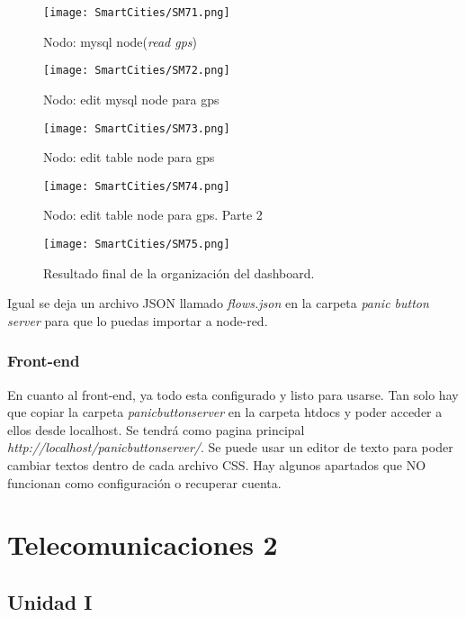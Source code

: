 \documentclass[
	12pt, %
	fleqn, %
	a4paper, %
	oneside, %
]{LegrandOrangeBook}
\begin{document}
\begin{figure}[]
\centering\texttt{[image: SmartCities/SM71.png]}
\caption{Nodo: mysql node(\textit{read gps})}
\label{fig:nodomysql4}
\end{figure}
\begin{figure}[]
\centering\texttt{[image: SmartCities/SM72.png]}
\caption{Nodo: edit mysql node para gps}
\label{fig:nodomysql5}
\end{figure}
\begin{figure}[]
\centering\texttt{[image: SmartCities/SM73.png]}
\caption{Nodo: edit table node para gps}
\label{fig:nodotable1}
\end{figure}
\begin{figure}[]
\centering\texttt{[image: SmartCities/SM74.png]}
\caption{Nodo: edit table node para gps. Parte 2}
\label{fig:nodotable2}
\end{figure}
\begin{figure}[]
\centering\texttt{[image: SmartCities/SM75.png]}
\caption{Resultado final de la organización del dashboard.}
\label{fig:dash}
\end{figure}
Igual se deja un archivo JSON llamado \textit{flows.json} en la carpeta \textit{panic button server} para que lo puedas importar a node-red.
\newpage
\section{Front-end}
En cuanto al front-end, ya todo esta configurado y listo para usarse. Tan solo hay que copiar la carpeta \textit{panicbuttonserver} en la carpeta htdocs y poder acceder a ellos desde localhost. Se tendrá como pagina principal \textit{http://localhost/panicbuttonserver/}. Se puede usar un editor de texto para poder cambiar textos dentro de cada archivo CSS. Hay algunos apartados que NO funcionan como configuración o recuperar cuenta.
\part{Telecomunicaciones 2}

\chapter{Unidad I}
\end{document}
